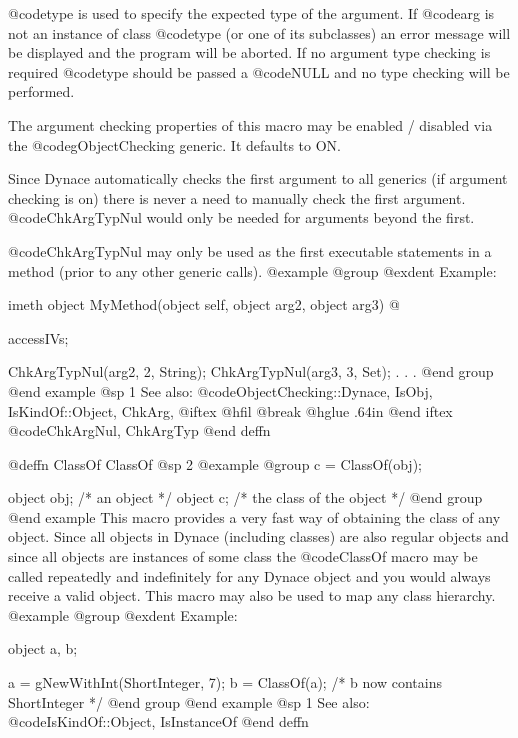 {{{@code{type} is used to specify the expected type of the argument.  If
@code{arg} is not an instance of class @code{type} (or one of its
subclasses) an error message will be displayed and the program will be
aborted.  If no argument type checking is required @code{type} should
be passed a @code{NULL} and no type checking will be performed.

The argument checking properties of this macro may be enabled / disabled
via the @code{gObjectChecking} generic.  It defaults to ON.

Since Dynace automatically checks the first argument to all generics (if
argument checking is on) there is never a need to manually check the
first argument.  @code{ChkArgTypNul} would only be needed for arguments
beyond the first.

@code{ChkArgTypNul} may only be used as the first executable statements in a
method (prior to any other generic calls).
@example
@group
@exdent Example:

imeth object  MyMethod(object self, object arg2, object arg3)
@{
        accessIVs;

        ChkArgTypNul(arg2, 2, String);
        ChkArgTypNul(arg3, 3, Set);
        .
        .
        .
@end group
@end example
@sp 1
See also:  @code{ObjectChecking::Dynace, IsObj, IsKindOf::Object, ChkArg,}
@iftex
@hfil @break @hglue .64in 
@end iftex
@code{ChkArgNul, ChkArgTyp}
@end deffn














@deffn {ClassOf} ClassOf
@sp 2
@example
@group
c = ClassOf(obj);

object  obj;    /*  an object                   */
object  c;      /*  the class of the object     */
@end group
@end example
This macro provides a very fast way of obtaining the class of any object.
Since all objects in Dynace (including classes) are also regular objects and
since all objects are instances of some class the @code{ClassOf} macro
may be called repeatedly and indefinitely for any Dynace object and you
would always receive a valid object.  This macro may also be used to
map any class hierarchy.
@example
@group
@exdent Example:

object  a, b;

a = gNewWithInt(ShortInteger, 7);
b = ClassOf(a);   /*  b now contains ShortInteger  */
@end group
@end example
@sp 1
See also:  @code{IsKindOf::Object, IsInstanceOf}
@end deffn





}}}}
